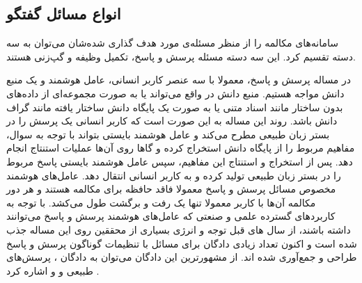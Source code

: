 \subsection{‌انواع مسائل گفتگو}

سامانه‌های مکالمه را از منظر
مسئله‌ی مورد هدف گذاری شده‌شان می‌توان به سه دسته تقسیم کرد. این سه دسته مسئله پرسش و پاسخ، تکمیل وظیفه و گپ‌زنی 
هستند.

در مساله پرسش و پاسخ، معمولا با سه عنصر کاربر انسانی، عامل هوشمند و یک منبع دانش مواجه هستیم. منبع دانش در واقع می‌تواند یا به صورت مجموعه‌ای از داده‌های بدون ساختار مانند اسناد متنی یا به صورت یک پایگاه دانش ساختار یافته مانند گراف دانش باشد. روند این مساله به این صورت است که کاربر انسانی یک پرسش را در بستر زبان طبیعی مطرح می‌کند و عامل هوشمند بایستی بتواند با توجه به سوال، مفاهیم مربوط را از پایگاه دانش استخراج کرده و گاها روی آن‌ها عملیات استنتاج انجام دهد. پس از استخراج و استنتاج این مفاهیم، سپس عامل هوشمند بایستی پاسخ مربوط را در بستر زبان طبیعی تولید کرده و به کاربر انسانی انتقال دهد.
عامل‌های هوشمند مخصوص مسائل پرسش و پاسخ معمولا فاقد حافظه برای مکالمه هستند و هر دور مکالمه آن‌ها با کاربر معمولا تنها یک رفت و برگشت طول می‌کشد. با توجه به کاربرد‌های گسترده علمی و صنعتی که عامل‌های هوشمند پرسش و پاسخ می‌توانند داشته باشند، از سال های قبل توجه و انرژی بسیاری از محققین روی این مساله جذب شده است و اکنون تعداد زیادی دادگان برای مسائل با تنظیمات گوناگون پرسش و پاسخ طراحی و جمع‌آوری شده اند. از مشهورترین این دادگان می‌توان به دادگان 
، پرسش‌های طبیعی و 
  و 
   اشاره کرد
\cite{squad_paper, cnnqa_paper, naturalqa_paper, wikiqa_paper}.



